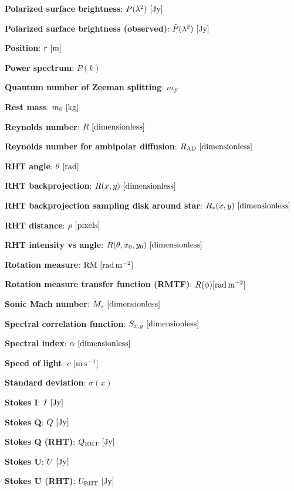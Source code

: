 \documentclass[a4paper,11pt]{article}
\begin{document}
{\noindent}\textbf{Polarized surface brightness}: $P(\lambda^2) ~ [\rm Jy]$

{\noindent}\textbf{Polarized surface brightness (observed)}: $\tilde{P}(\lambda^2) ~ [\rm Jy]$

{\noindent}\textbf{Position}: $r~[{\rm m}]$

{\noindent}\textbf{Power spectrum}: $P(k)$

{\noindent}\textbf{Quantum number of Zeeman splitting}: $m_F$

{\noindent}\textbf{Rest mass}: $m_0~[{\rm kg}]$

{\noindent}\textbf{Reynolds number}: $R~[{\rm dimensionless}]$

{\noindent}\textbf{Reynolds number for ambipolar diffusion}: $R_\mathrm{AD}~[{\rm dimensionless}]$

{\noindent}\textbf{RHT angle}: $\theta~[{\rm rad}]$

{\noindent}\textbf{RHT backprojection}: $R(x,y) ~ [{\rm dimensionless}]$

{\noindent}\textbf{RHT backprojection sampling disk around star}: $R_*(x,y) ~ [{\rm dimensionless}]$

{\noindent}\textbf{RHT distance}: $\rho~[{\rm pixels}]$

{\noindent}\textbf{RHT intensity vs angle}: $R(\theta,x_0,y_0)~[{\rm dimensionless}]$

{\noindent}\textbf{Rotation measure}: ${\rm RM~[rad\,m^{-2}]}$

{\noindent}\textbf{Rotation measure transfer function (RMTF)}: $R(\phi) {\rm [rad\,m^{-2}]}$

{\noindent}\textbf{Sonic Mach number}: $M_s~[{\rm dimensionless]}$

{\noindent}\textbf{Spectral correlation function}: $S_{x,y}~[\rm{dimensionless}]$

{\noindent}\textbf{Spectral index}: $\alpha~[\rm{dimensionless}]$

{\noindent}\textbf{Speed of light}: $c~[\rm{m\,s^{-1}}]$

{\noindent}\textbf{Standard deviation}: $\sigma(x)$

{\noindent}\textbf{Stokes I}: $I ~ [\rm Jy]$

{\noindent}\textbf{Stokes Q}: $Q ~ [\rm Jy]$

{\noindent}\textbf{Stokes Q (RHT)}: $Q_\mathrm{RHT} ~ [\rm Jy]$

{\noindent}\textbf{Stokes U}: $U ~ [\rm Jy]$

{\noindent}\textbf{Stokes U (RHT)}: $U_\mathrm{RHT} ~ [\rm Jy]$
\end{document}
